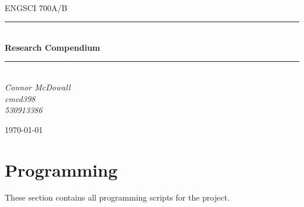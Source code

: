 \documentclass[12pt]{article}
\begin{document}
\begin{titlepage}
	\newcommand{\HRule}{\rule{\linewidth}{0.5mm}} %
	
	\center
	
	
	\textsc{\LARGE }\\[1.5cm] %
	
	\textsc{\Large ENGSCI 700A/B}\\[0.5cm] %
	
	
	\HRule\\[0.5cm]
	
	{\huge\bfseries Research Compendium}\\[0.4cm] %
	
	\HRule\\[0.5cm]
	
	
	{\large\textit{Connor McDowall \\cmcd398 \\530913386}}\\
	
	
	\vfill\vfill\vfill %
	
	{\large\today} %
	 
	
	\vfill %
	
\end{titlepage}
\tableofcontents
\listoffigures
\listoftables
\newpage
\section{Programming}
These section contains all programming scripts for the project.
\end{document}
